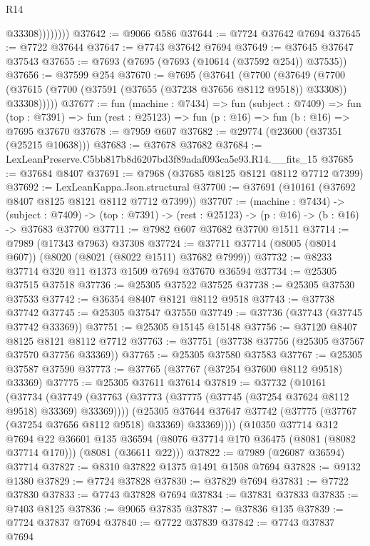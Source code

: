 \begin{lexlean}{R14}
\begin{coremodule}
                    @33308))))))))
@37642 := @9066 @586
@37644 := @7724 @37642 @7694
@37645 := @7722 @37644
@37647 := @7743 @37642 @7694
@37649 := @37645 @37647 @37543
@37655 := @7693 (@7695 (@7693 (@10614 (@37592 @254)) @37535))
@37656 := @37599 @254
@37670 := @7695
    (@37641
      (@7700
        (@37649
          (@7700 (@37615 (@7700 (@37591 (@37655 (@37238 @37656 @8112 @9518)) @33308)) @33308)))))
@37677 := fun (machine : @7434) =>
  fun (subject : @7409) =>
  fun (top : @7391) => fun (rest : @25123) => fun (p : @16) => fun (b : @16) => @7695 @37670
@37678 := @7959 @607
@37682 := @29774 (@23600 (@37351 (@25215 @10638)))
@37683 := @37678 @37682
@37684 := LexLeanPreserve.C5bb817b8d6207bd3f89adaf093ca5e93.R14.__fits_15
@37685 := @37684 @8407
@37691 := @7968 (@37685 @8125 @8121 @8112 @7712 @7399)
@37692 := LexLeanKappa.Json.structural
@37700 := @37691 (@10161 (@37692 @8407 @8125 @8121 @8112 @7712 @7399))
@37707 := (machine : @7434) ->
  (subject : @7409) -> (top : @7391) -> (rest : @25123) -> (p : @16) -> (b : @16) -> @37683 @37700
@37711 := @7982 @607 @37682 @37700 @1511
@37714 := @7989 (@17343 @7963) @37308
@37724 := @37711 @37714 (@8005 (@8014 @607)) (@8020 (@8021 (@8022 @1511) @37682 @7999))
@37732 := @8233 @37714 @320 @11 @1373 @1509 @7694 @37670 @36594
@37734 := @25305 @37515 @37518
@37736 := @25305 @37522 @37525
@37738 := @25305 @37530 @37533
@37742 := @36354 @8407 @8121 @8112 @9518
@37743 := @37738 @37742
@37745 := @25305 @37547 @37550
@37749 := @37736 (@37743 (@37745 @37742 @33369))
@37751 := @25305 @15145 @15148
@37756 := @37120 @8407 @8125 @8121 @8112 @7712
@37763 := @37751 (@37738 @37756 (@25305 @37567 @37570 @37756 @33369))
@37765 := @25305 @37580 @37583
@37767 := @25305 @37587 @37590
@37773 := @37765 (@37767 (@37254 @37600 @8112 @9518) @33369)
@37775 := @25305 @37611 @37614
@37819 := @37732
    (@10161
      (@37734
        (@37749 (@37763 (@37773 (@37775 (@37745 (@37254 @37624 @8112 @9518) @33369) @33369))))
        (@25305 @37644 @37647 @37742 (@37775 (@37767 (@37254 @37656 @8112 @9518) @33369) @33369))))
    (@10350
      @37714
      @312
      @7694
      @22
      @36601
      @135
      @36594
      (@8076 @37714 @170 @36475 (@8081 (@8082 @37714 @170)))
      (@8081 (@36611 @22)))
@37822 := @7989 (@26087 @36594) @37714
@37827 := @8310 @37822 @1375 @1491 @1508 @7694
@37828 := @9132 @1380
@37829 := @7724 @37828
@37830 := @37829 @7694
@37831 := @7722 @37830
@37833 := @7743 @37828 @7694
@37834 := @37831 @37833
@37835 := @7403 @8125
@37836 := @9065 @37835
@37837 := @37836 @135
@37839 := @7724 @37837 @7694
@37840 := @7722 @37839
@37842 := @7743 @37837 @7694

\end{coremodule}
\end{lexlean}
